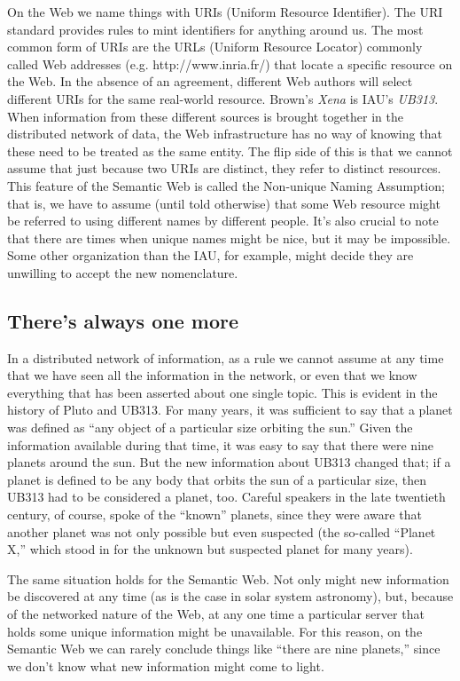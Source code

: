 On the Web we name things with URIs (Uniform Resource Identifier). The
URI standard provides rules to mint identifiers for anything around us.
The most common form of URIs are the URLs (Uniform Resource Locator)
commonly called Web addresses (e.g. http://www.inria.fr/) that locate a
specific resource on the Web. In the absence of an agreement, different
Web authors will select different URIs for the same real-world resource.
Brown's \emph{Xena} is IAU's \emph{UB313}. When information from these
different sources is brought together in the distributed network of
data, the Web infrastructure has no way of knowing that these need to be
treated as the same entity. The flip side of this is that we cannot
assume that just because two URIs are distinct, they refer to distinct
resources. This feature of the Semantic Web is called the Non-unique
Naming Assumption; that is, we have to assume (until told otherwise)
that some Web resource might be referred to using different names by
different people. It's also crucial to note that there are times when
unique names might be nice, but it may be impossible. Some other
organization than the IAU, for example, might decide they are unwilling
to accept the new nomenclature.

\subsection{There's always one more}

In a distributed network of information, as a rule we cannot assume at
any time that we have seen all the information in the network, or even
that we know everything that has been asserted about one single topic.
This is evident in the history of Pluto and UB313. For many years, it
was sufficient to say that a planet was defined as ``any object of a
particular size orbiting the sun.'' Given the information available
during that time, it was easy to say that there were nine planets around
the sun. But the new information about UB313 changed that; if a planet
is defined to be any body that orbits the sun of a particular size, then
UB313 had to be considered a planet, too. Careful speakers in the late
twentieth century, of course, spoke of the ``known'' planets, since they
were aware that another planet was not only possible but even suspected
(the so-called ``Planet X,'' which stood in for the unknown but
suspected planet for many years).

The same situation holds for the Semantic Web. Not only might new
information be discovered at any time (as is the case in solar system
astronomy), but, because of the networked nature of the Web, at any one
time a particular server that holds some unique information might be
unavailable. For this reason, on the Semantic Web we can rarely conclude
things like ``there are nine planets,'' since we don't know what new
information might come to light.

